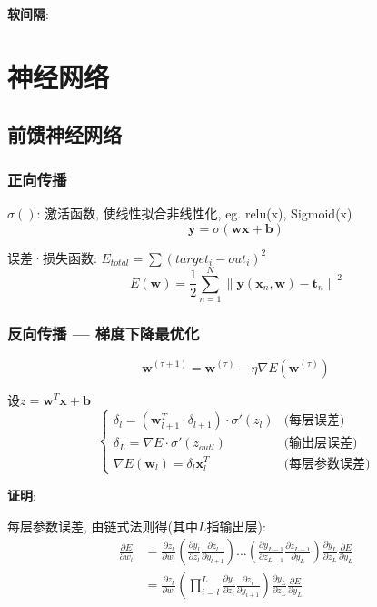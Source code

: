 \documentclass{article}
\begin{document}
	\textbf{软间隔}:

\section{神经网络}
    \subsection{前馈神经网络}
        \subsubsection{正向传播}
            $\sigma()$: 激活函数, 使线性拟合非线性化, eg. relu(x), Sigmoid(x)
            $$\boldsymbol y = \sigma (\boldsymbol w \boldsymbol x + \boldsymbol b)$$


            误差·损失函数: $E_{total} = \sum (target_i - out_i)^2$
            $$E(\boldsymbol{w})=\frac{1}{2} \sum_{n=1}^{N}\left\|\boldsymbol{y}\left(\boldsymbol{x}_{n}, \boldsymbol{w}\right)-\boldsymbol{t}_{n}\right\|^{2}$$

        \subsubsection{反向传播 --- 梯度下降最优化}
    		$$\boldsymbol{w}^{(\tau+1)}=\boldsymbol{w}^{(\tau)}-\eta \nabla E\left(\boldsymbol{w}^{(\tau)}\right)$$
    		
    		设$z = \boldsymbol w^T \boldsymbol x + \boldsymbol b$
            $$\left \{ \begin{array}{lr}
                \delta_l = (\boldsymbol w_{l+1}^T·\delta_{l+1})·\sigma'(z_l) & \text{(每层误差)}\\
                \delta_L = \nabla E · \sigma'(z_{outl}) & \text{(输出层误差)}\\
                \nabla E(\boldsymbol w_l) = \delta_l \boldsymbol x_l^T & \text{(每层参数误差)}
            \end{array} \right.$$

            \textbf{证明}:
        		
        		每层参数误差, 由链式法则得(其中$L$指输出层): 
        		    \begin{align*}
        		        \frac{\partial E}{\partial w_l} 
        		        &= \frac{\partial z_l}{\partial w_l} \left(\frac{\partial y_l}{\partial z_l}\frac{\partial z_l}{\partial y_{l+1}}\right) ... \left(\frac{\partial y_{L-1}}{\partial z_{L-1}} \frac{\partial z_{L-1}}{\partial y_L} \right) \frac{\partial y_L}{\partial z_L} \frac{\partial E}{\partial y_L}\\
        		        &= \frac{\partial z_l}{\partial w_l}  \left(\prod_{i = l}^{L} \frac{\partial y_i}{\partial z_i}\frac{\partial z_i}{\partial y_{i+1}} \right) \frac{\partial y_L}{\partial z_L} \frac{\partial E}{\partial y_L}
        		    \end{align*}
        		    
\end{document}
